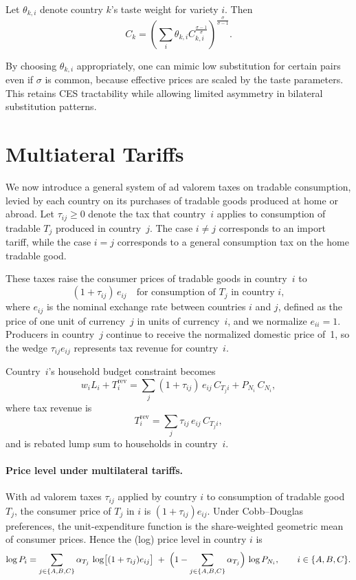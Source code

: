 \documentclass[11pt]{article}
\begin{document}
Let $\theta_{k,i}$ denote country $k$'s taste weight for variety $i$.
Then
\[
C_k
=
\left(
  \sum_i
    \theta_{k,i}
    C_{k,i}^{\frac{\sigma - 1}{\sigma}}
\right)^{\frac{\sigma}{\sigma - 1}}.
\]

By choosing $\theta_{k,i}$ appropriately, one can mimic low substitution
for certain pairs even if $\sigma$ is common, because effective prices are
scaled by the taste parameters. This retains CES tractability while
allowing limited asymmetry in bilateral substitution patterns.



\section*{Multiateral Tariffs}

We now introduce a general system of ad valorem taxes on tradable consumption, 
levied by each country on its purchases of tradable goods produced at home or abroad. 
Let $\tau_{ij} \ge 0$ denote the tax that country~$i$ applies to consumption of 
tradable $T_j$ produced in country~$j$. The case $i \neq j$ corresponds to an 
import tariff, while the case $i=j$ corresponds to a general consumption tax on 
the home tradable good.

These taxes raise the consumer prices of tradable goods in country~$i$ to
\[
(1+\tau_{ij})\, e_{ij}
\quad\text{for consumption of } T_j \text{ in country } i,
\]
where $e_{ij}$ is the nominal exchange rate between countries $i$ and $j$, defined as 
the price of one unit of currency~$j$ in units of currency~$i$, and we normalize 
$e_{ii}=1$. Producers in country~$j$ continue to receive the normalized domestic price 
of~1, so the wedge $\tau_{ij} e_{ij}$ represents tax revenue for country~$i$.

Country~$i$'s household budget constraint becomes
\begin{equation}
w_i L_i + T_i^{\mathrm{rev}}
=
\sum_{j} (1+\tau_{ij})\, e_{ij}\, C_{T_j i}
+ P_{N_i}\, C_{N_i},
\end{equation}
where tax revenue is
\begin{equation}
T_i^{\mathrm{rev}}
= \sum_{j} \tau_{ij}\, e_{ij}\, C_{T_j i},
\end{equation}
and is rebated lump sum to households in country~$i$.

\paragraph{Price level under multilateral tariffs.}
With ad valorem taxes $\tau_{ij}$ applied by country $i$ to consumption of tradable good $T_j$, the consumer price of $T_j$ in $i$ is $(1+\tau_{ij}) e_{ij}$. Under Cobb--Douglas preferences, the unit-expenditure function is the share-weighted geometric mean of consumer prices. Hence the (log) price level in country $i$ is
\begin{equation}
\log P_i 
= 
\sum_{j\in\{A,B,C\}} 
\alpha_{T_j}\, \log\!\big[(1+\tau_{ij}) e_{ij}\big]
\;+\;
\Bigl(1 - \sum_{j\in\{A,B,C\}} \alpha_{T_j}\Bigr)\, \log P_{N_i},
\qquad i\in\{A,B,C\}.
\label{eq:price_level_tariffs}
\end{equation}
\end{document}
